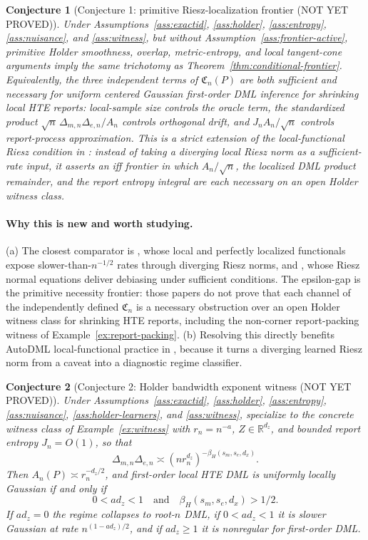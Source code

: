 \documentclass[11pt]{article}
\newcommand{\R}{\mathbb{R}}
\theoremstyle{definition}
\theoremstyle{plain}
\newtheorem{conjecture}{Conjecture}
\theoremstyle{remark}
\begin{document}
\begin{conjecture}[Conjecture 1: primitive Riesz-localization frontier (NOT YET PROVED)]\label{conj:primitive-critical-radius}
Under Assumptions~\ref{ass:exactid}, \ref{ass:holder}, \ref{ass:entropy},
\ref{ass:nuisance}, and \ref{ass:witness}, but without
Assumption~\ref{ass:frontier-active}, primitive Holder smoothness, overlap,
metric-entropy, and local tangent-cone arguments imply the same trichotomy as
Theorem~\ref{thm:conditional-frontier}.  Equivalently, the three independent
terms of \(\mathfrak C_n(P)\) are both sufficient and necessary for uniform
centered Gaussian first-order DML inference for shrinking local HTE reports:
local-sample size controls the oracle term, the standardized product
\(\sqrt n\,\Delta_{m,n}\Delta_{e,n}/A_n\) controls orthogonal drift, and
\(J_nA_n/\sqrt n\) controls report-process approximation.  This is a strict
extension of the local-functional Riesz condition in
\citet[Section~2]{ChernozhukovNeweySingh2022Riesz}: instead of taking a
diverging local Riesz norm as a sufficient-rate input, it asserts an iff
frontier in which \(A_n/\sqrt n\), the localized DML product remainder, and
the report entropy integral are each necessary on an open Holder witness
class.
\end{conjecture}
\paragraph{Why this is new and worth studying.}
(a) The closest comparator is
\citet[Section~2]{ChernozhukovNeweySingh2022Riesz}, whose local and perfectly
localized functionals expose slower-than-\(n^{-1/2}\) rates through diverging
Riesz norms, and
\citet[Sections~2--3]{ChernozhukovNeweySingh2022AutoDML}, whose Riesz normal
equations deliver debiasing under sufficient conditions.  The epsilon-gap is
the primitive necessity frontier: those papers do not prove that each channel
of the independently defined \(\mathfrak C_n\) is a necessary obstruction over
an open Holder witness class for shrinking HTE reports, including the
non-corner report-packing witness of Example~\ref{ex:report-packing}.  (b)
Resolving this directly benefits AutoDML local-functional practice in
\citet{ChernozhukovNeweySingh2022AutoDML}, because it turns a diverging learned
Riesz norm from a caveat into a diagnostic regime classifier.

\begin{conjecture}[Conjecture 2: Holder bandwidth exponent witness (NOT YET PROVED)]\label{conj:holder-exponent}
Under Assumptions~\ref{ass:exactid}, \ref{ass:holder}, \ref{ass:entropy},
\ref{ass:nuisance}, \ref{ass:holder-learners}, and \ref{ass:witness},
specialize to the concrete witness class of Example~\ref{ex:witness} with
\(r_n=n^{-a}\), \(Z\in\R^{d_z}\), and bounded report entropy \(J_n=O(1)\), so
that
\[
\Delta_{m,n}\Delta_{e,n}
\asymp (nr_n^{d_z})^{-\beta_H(s_m,s_e,d_x)}.
\]
Then \(A_n(P)\asymp r_n^{-d_z/2}\), and first-order local HTE DML is uniformly
locally Gaussian if and only if
\[
0<a d_z<1
\quad\text{and}\quad
\beta_H(s_m,s_e,d_x)>1/2.
\]
If \(a d_z=0\) the regime collapses to root-\(n\) DML, if
\(0<a d_z<1\) it is slower Gaussian at rate \(n^{(1-a d_z)/2}\), and if
\(a d_z\ge1\) it is nonregular for first-order DML.
\end{conjecture}
\end{document}
